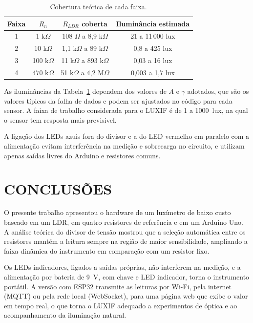 \documentclass[11pt,a4paper]{article}
\begin{document}
\begin{table}[H]
	\centering
	\caption{Cobertura teórica de cada faixa.}
	\label{tab:faixas}
	\small
	\begin{tabular}{cccc}
		\toprule
		Faixa & $R_n$ & $R_{LDR}$ coberta & Iluminância estimada \\
		\midrule
		1 & 1 k$\Omega$ & 108 $\Omega$ a 8,9 k$\Omega$ & 21 a 11\,000 lux \\
		2 & 10 k$\Omega$ & 1,1 k$\Omega$ a 89 k$\Omega$ & 0,8 a 425 lux \\
		3 & 100 k$\Omega$ & 11 k$\Omega$ a 893 k$\Omega$ & 0,03 a 16 lux \\
		4 & 470 k$\Omega$ & 51 k$\Omega$ a 4,2 M$\Omega$ & 0,003 a 1,7 lux \\
		\bottomrule
	\end{tabular}
\end{table}

As iluminâncias da Tabela~\ref{tab:faixas} dependem dos valores de $A$ e $\gamma$ adotados, que são os valores típicos da folha de dados e podem ser ajustados no código para cada sensor. A faixa de trabalho considerada para o LUXIF é de 1 a 1000~lux, na qual o sensor tem resposta mais previsível.

A ligação dos LEDs azuis fora do divisor e a do LED vermelho em paralelo com a alimentação evitam interferência na medição e sobrecarga no circuito, e utilizam apenas saídas livres do Arduino e resistores comuns.

\section*{CONCLUSÕES}

O presente trabalho apresentou o hardware de um luxímetro de baixo custo baseado em um LDR, em quatro resistores de referência e em um Arduino Uno. A análise teórica do divisor de tensão mostrou que a seleção automática entre os resistores mantém a leitura sempre na região de maior sensibilidade, ampliando a faixa dinâmica do instrumento em comparação com um resistor fixo.

Os LEDs indicadores, ligados a saídas próprias, não interferem na medição, e a alimentação por bateria de 9~V, com chave e LED indicador, torna o instrumento portátil. A versão com ESP32 transmite as leituras por Wi-Fi, pela internet (MQTT) ou pela rede local (WebSocket), para uma página web que exibe o valor em tempo real, o que torna o LUXIF adequado a experimentos de óptica e ao acompanhamento da iluminação natural.
\end{document}
